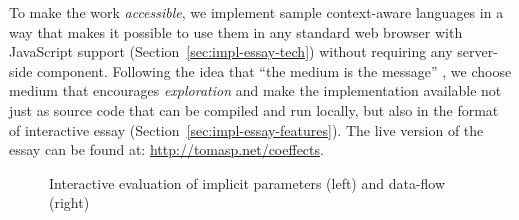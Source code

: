 \noindent
To make the work \emph{accessible}, we implement sample context-aware languages in a way that makes it
possible to use them in any standard web browser with JavaScript support (Section~\ref{sec:impl-essay-tech})
without requiring any server-side component. Following the idea that ``the medium is the message'' \cite{essay-medium},
we choose medium that encourages \emph{exploration} and make the implementation available not just
as source code that can be compiled and run locally, but also in the format of
interactive essay (Section~\ref{sec:impl-essay-features}). The live version of the essay can be
found at: \url{http://tomasp.net/coeffects}.


\begin{figure}[t]
\caption{Interactive evaluation of implicit parameters (left) and data-flow (right)}
\label{fig:essay-eval}
\end{figure}


